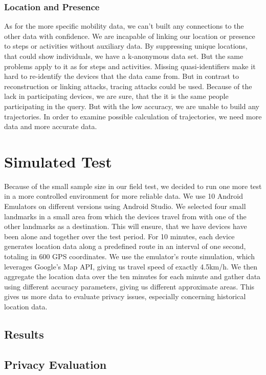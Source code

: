 \subsubsection{Location and Presence}

As for the more specific mobility data, we can't built any connections to the other data with confidence. We are incapable of linking our location or presence to steps or activities without auxiliary data. By suppressing unique locations, that could show individuals, we have a k-anonymous data set. But the same problems apply to it as for steps and activities. Missing quasi-identifiers make it hard to re-identify the devices that the data came from. 
But in contrast to reconstruction or linking attacks, tracing attacks could be used. Because of the lack in participating devices, we are sure, that the it is the same people participating in the query. But with the low accuracy, we are unable to build any trajectories. In order to examine possible calculation of trajectories, we need more data and more accurate data.

\section{Simulated Test}
Because of the small sample size in our field test, we decided to run one more test in a more controlled environment for more reliable data. We use 10 Android Emulators on different versions using Android Studio. We selected four small landmarks in a small area from which the devices travel from with one of the other landmarks as a destination. This will ensure, that we have devices have been alone and together over the test period. For 10 minutes, each device generates location data along a predefined route in an interval of one second, totaling in 600 GPS coordinates. We use the emulator's route simulation, which leverages Google's Map API, giving us travel speed of exactly 4.5km/h. We then aggregate the location data over the ten minutes for each minute and gather data using different accuracy parameters, giving us different approximate areas. This gives us more data to evaluate privacy issues, especially concerning historical location data.

\subsection{Results}


\subsection{Privacy Evaluation}
